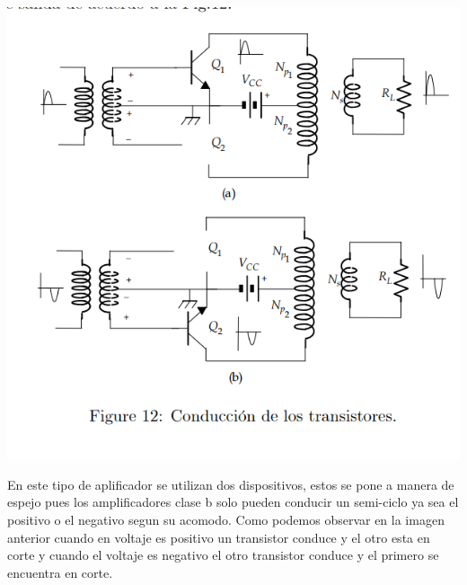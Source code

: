 \documentclass[12pt,a4paper]{report}
\begin{document}
\begin{center}
\includegraphics[scale=0.5]{02.png}
\end{center}
En este tipo de aplificador se utilizan dos dispositivos, estos se pone a manera de espejo pues los amplificadores clase b solo pueden conducir un semi-ciclo ya sea el positivo o el negativo segun su acomodo. Como podemos observar en la imagen anterior cuando en voltaje es positivo un transistor conduce y el otro esta en corte y cuando el voltaje es negativo el otro transistor conduce y el primero se encuentra en corte.\\
\cite{amplificadores}
 

\end{document}
